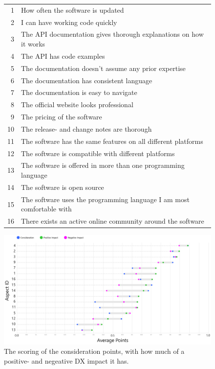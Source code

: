\documentclass{article}
\begin{document}
\begin{figure}[H]
\centering
\begin{tabular}{r l}
\hline
1    & How often the software is updated    \\
2    & I can have working code quickly  \\
3    & The API documentation gives thorough explanations on how it works    \\
4    & The API has code examples    \\
5    & The documentation doesn't assume any prior expertise \\
6    & The documentation has consistent language    \\
7    & The documentation is easy to navigate    \\
8    & The official website looks professional  \\
9    & The pricing of the software  \\
10    &  The release- and change notes are thorough \\
11   &  The software has the same features on all different platforms   \\
12    &  The software is compatible with different platforms    \\
13  &  The software is offered in more than one programming language    \\
14    &  The software is open source    \\
15    &  The software uses the programming language I am most comfortable with  \\
16    &  There exists an active online community around the software    \\ \hline
\end{tabular}
\hspace*{-0.25\textwidth}\includegraphics[width=1.5\textwidth]{dxandconsid.png}
\caption{The scoring of the consideration points, with how much of a positive- and negeative DX impact it has.}
\label{fig:dxandcosnid}
\end{figure}
\end{document}
